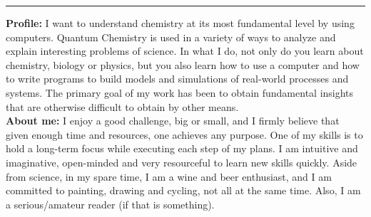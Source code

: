\documentclass[12pt]{extarticle}
\begin{document}
\begin{minipage}{0.65\columnwidth}
\vspace*{-1mm} 
\hspace*{-1.9mm}
\noindent
{\color{gray!20!white} \rule{1.01\linewidth}{3mm} }


\vspace*{-5mm}
{\bf\large Profile:}
I want to understand chemistry at its most fundamental level by using computers. Quantum Chemistry is used in a variety of ways to analyze and explain interesting problems of science. In what I do, not only do you learn about chemistry, biology or physics, but you also learn how to use a computer and how to write programs to build models and simulations of real-world processes and systems. The primary goal of my work has been to obtain fundamental insights that are otherwise difficult to obtain by other means.\\







\vspace*{-2mm}
{\bf\large About me:}
I enjoy a good challenge, big or small, and I firmly believe that given enough time and resources, one achieves any purpose. One of my skills is to hold a long-term focus while executing each step of my plans. I am intuitive and imaginative, open-minded and very resourceful to learn new skills quickly. Aside from science, in my spare time, I am a wine and beer enthusiast, and I am committed to painting, drawing and cycling, not all at the same time. Also, I am a serious/amateur reader (if that is something).


\end{minipage}
\end{document}
